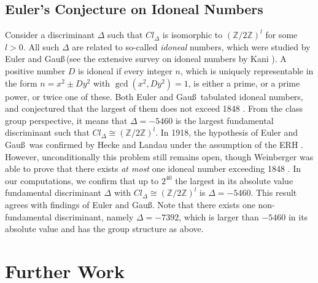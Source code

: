\documentclass{mcom-l}
\theoremstyle{definition}
\begin{document}
\subsection{Euler's Conjecture on Idoneal Numbers}
Consider a discriminant $\Delta$ such that $Cl_\Delta$ is isomorphic
to $(\mathbb Z/2\mathbb Z)^l$ for some $l > 0$. All such $\Delta$ are
related to so-called \emph{idoneal} numbers, which were studied by
Euler and Gau\ss\,(see the extensive survey on idoneal numbers by Kani
\cite{kani}). A positive number $D$ is idoneal if every integer $n$,
which is uniquely representable in the form $n = x^2 \pm Dy^2$ with
$\gcd(x^2,Dy^2) = 1$, is either a prime, or a prime power, or twice
one of these.  Both Euler and Gau\ss\, tabulated idoneal numbers, and
conjectured that the largest of them does not exceed 1848
\cite[]{gauss}. From the class group perspective, it
means that $\Delta = -5460$ is the largest fundamental discriminant
such that $Cl_\Delta \cong (\mathbb Z/2\mathbb Z)^l$. In 1918, the
hypothesis of Euler and Gau\ss\, was confirmed by Hecke and Landau
under the assumption of the ERH \cite{landau}. However,
unconditionally this problem still remains open, though Weinberger was
able to prove that there exists \emph{at most} one idoneal number
exceeding 1848 \cite{weinberger}. In our computations, we confirm that
up to $2^{40}$ the largest in its absolute value fundamental
discriminant $\Delta$ with $Cl_\Delta \cong (\mathbb Z/2\mathbb Z)^l$
is $\Delta = -5460$. This result agrees with findings of Euler and
Gau\ss. Note that there exists one non-fundamental discriminant, namely
$\Delta = -7392$, which is larger than $-5460$ in its absolute value and
has the group structure as above.

\section{Further Work} \label{sec:furtherwork}
\end{document}
